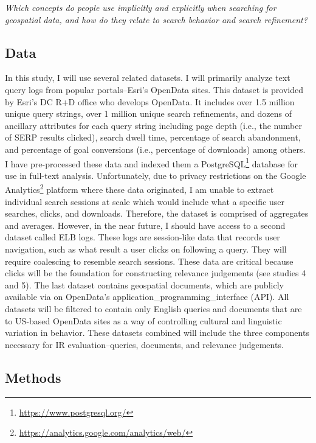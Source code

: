 \emph{Which concepts do people use implicitly and explicitly when searching for geospatial data, and how do they relate to search behavior and search refinement?}

\subsection{Data}

In this study, I will use several related datasets. I will primarily analyze text query logs from popular portals–Esri’s OpenData sites. This dataset is provided by Esri’s DC R+D office who develops OpenData. It includes over 1.5 million unique query strings, over 1 million unique search refinements, and dozens of ancillary attributes for each query string including page depth (i.e., the number of SERP results clicked), search dwell time, percentage of search abandonment, and percentage of goal conversions (i.e., percentage of downloads) among others. I have pre-processed these data and indexed them a PostgreSQL\footnote{\url{https://www.postgresql.org/}} database for use in full-text analysis. Unfortunately, due to privacy restrictions on the Google Analytics\footnote{\url{https://analytics.google.com/analytics/web/}} platform where these data originated, I am unable to extract individual search sessions at scale which would include what a specific user searches, clicks, and downloads. Therefore, the dataset is comprised of aggregates and averages. However, in the near future, I should have access to a second dataset called ELB logs. These logs are session-like data that records user navigation, such as what result a user clicks on following a query. They will require coalescing to resemble search sessions. These data are critical because clicks will be the foundation for constructing relevance judgements (see studies 4 and 5). The last dataset contains geospatial documents, which are publicly available via on OpenData’s \gls{application_programming_interface} (\acrshort{API}). All datasets will be filtered to contain only English queries and documents that are to US-based OpenData sites as a way of controlling cultural and linguistic variation in behavior. These datasets combined will include the three components necessary for IR evaluation–queries, documents, and relevance judgements.

\subsection{Methods}

